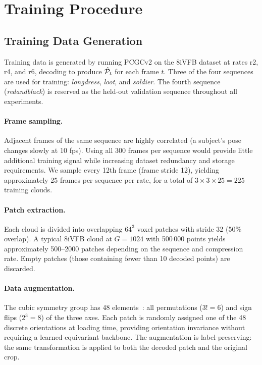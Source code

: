 \section{Training Procedure}
\label{sec:training}

\subsection{Training Data Generation}

Training data is generated by running PCGCv2 on the 8iVFB dataset at rates
r2, r4, and r6, decoding to produce $\hat{\mathcal{P}}_t$ for each frame $t$.
Three of the four sequences are used for training: \textit{longdress},
\textit{loot}, and \textit{soldier}.
The fourth sequence (\textit{redandblack}) is reserved as the held-out
validation sequence throughout all experiments.

\paragraph{Frame sampling.}
Adjacent frames of the same sequence are highly correlated (a subject's pose
changes slowly at 10 fps).
Using all 300 frames per sequence would provide little additional training
signal while increasing dataset redundancy and storage requirements.
We sample every 12th frame (frame stride 12), yielding approximately 25 frames
per sequence per rate, for a total of $3 \times 3 \times 25 = 225$ training
clouds.

\paragraph{Patch extraction.}
Each cloud is divided into overlapping $64^3$ voxel patches with stride 32
(50\% overlap).
A typical 8iVFB cloud at $G = 1024$ with 500\,000 points yields approximately
500--2000 patches depending on the sequence and compression rate.
Empty patches (those containing fewer than 10 decoded points) are discarded.

\paragraph{Data augmentation.}
The cubic symmetry group has 48 elements~\cite{winkels2018gcnn,cohen2016equivariant}: all permutations ($3! = 6$) and
sign flips ($2^3 = 8$) of the three axes.
Each patch is randomly assigned one of the 48 discrete orientations at
loading time, providing orientation invariance without requiring a learned
equivariant backbone.
The augmentation is label-preserving: the same transformation is applied to
both the decoded patch and the original crop.


